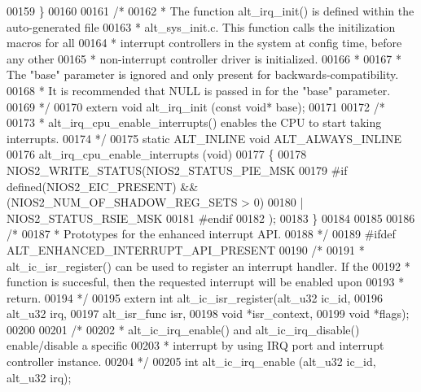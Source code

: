 \begin{DoxyCode}
00159 \}
00160 
00161 \textcolor{comment}{/*}
00162 \textcolor{comment}{ * The function alt\_irq\_init() is defined within the auto-generated file}
00163 \textcolor{comment}{ * alt\_sys\_init.c. This function calls the initilization macros for all}
00164 \textcolor{comment}{ * interrupt controllers in the system at config time, before any other}
00165 \textcolor{comment}{ * non-interrupt controller driver is initialized.}
00166 \textcolor{comment}{ *}
00167 \textcolor{comment}{ * The "base" parameter is ignored and only present for backwards-compatibility.}
00168 \textcolor{comment}{ * It is recommended that NULL is passed in for the "base" parameter.}
00169 \textcolor{comment}{ */}
00170 \textcolor{keyword}{extern} \textcolor{keywordtype}{void} alt_irq_init (\textcolor{keyword}{const} \textcolor{keywordtype}{void}* base);
00171 
00172 \textcolor{comment}{/*}
00173 \textcolor{comment}{ * alt\_irq\_cpu\_enable\_interrupts() enables the CPU to start taking interrupts.}
00174 \textcolor{comment}{ */}
00175 \textcolor{keyword}{static} ALT_INLINE \textcolor{keywordtype}{void} ALT_ALWAYS_INLINE 
00176        alt_irq_cpu_enable_interrupts (\textcolor{keywordtype}{void})
00177 \{
00178     NIOS2_WRITE_STATUS(NIOS2_STATUS_PIE_MSK
00179 #\textcolor{keywordflow}{if} defined(NIOS2\_EIC\_PRESENT) && (NIOS2\_NUM\_OF\_SHADOW\_REG\_SETS > 0)
00180     | NIOS2_STATUS_RSIE_MSK
00181 #endif      
00182       );
00183 \}
00184 
00185 
00186 \textcolor{comment}{/*}
00187 \textcolor{comment}{ * Prototypes for the enhanced interrupt API.}
00188 \textcolor{comment}{ */}
00189 \textcolor{preprocessor}{#ifdef ALT\_ENHANCED\_INTERRUPT\_API\_PRESENT}
00190 \textcolor{comment}{/*}
00191 \textcolor{comment}{ * alt\_ic\_isr\_register() can be used to register an interrupt handler. If the}
00192 \textcolor{comment}{ * function is succesful, then the requested interrupt will be enabled upon }
00193 \textcolor{comment}{ * return.}
00194 \textcolor{comment}{ */}
00195 \textcolor{keyword}{extern} \textcolor{keywordtype}{int} alt\_ic\_isr\_register(alt_u32 ic\_id,
00196                         alt_u32 irq,
00197                         alt_isr_func isr,
00198                         \textcolor{keywordtype}{void} *isr\_context,
00199                         \textcolor{keywordtype}{void} *flags);
00200 
00201 \textcolor{comment}{/* }
00202 \textcolor{comment}{ * alt\_ic\_irq\_enable() and alt\_ic\_irq\_disable() enable/disable a specific }
00203 \textcolor{comment}{ * interrupt by using IRQ port and interrupt controller instance.}
00204 \textcolor{comment}{ */}
00205 \textcolor{keywordtype}{int} alt\_ic\_irq\_enable (alt_u32 ic\_id, alt_u32 irq);

\end{DoxyCode}

